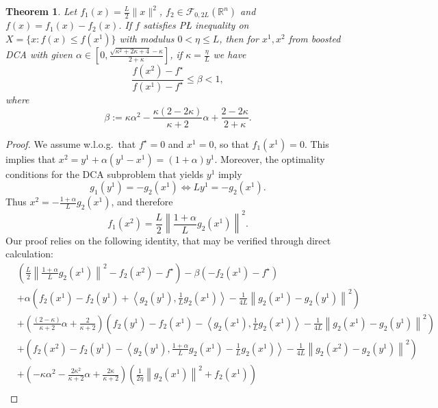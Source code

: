 \documentclass{article} %
\newtheorem{theorem}{Theorem}
\renewcommand{\leq}{\leqslant}
\begin{document}
\begin{theorem}
\label{thm:GD PL}
Let $f_1(x)=\frac{L}{2}\|x\|^2$, $f_2\in\mathcal{F}_{0, 2L}({\mathbb{R}^n})$ and $f(x)=f_1(x)-f_2(x)$. If
     $f$ satisfies P{\L} inequality on $X=\{x: f(x)\leq f(x^1)\}$ with modulus $0<\eta\leq L$, then for $x^1, x^2$  from boosted DCA with given
      $\alpha \in \left[0, \frac{\sqrt{\kappa^2 + 2\kappa +4}-\kappa}{2+ \kappa} \right]$,
      if $\kappa=\frac{\eta}{L}$ we have
\[
\frac{f(x^2)-f^\star}{f(x^1)-f^\star}\leq \beta < 1,
\]
where
\begin{equation}
\label{def:beta}
    \beta := \kappa \alpha^2 - \frac{\kappa(2-2\kappa)}{\kappa+2}\alpha + \frac{2-2\kappa}{2+\kappa}.
\end{equation}

\end{theorem}
\begin{proof}
  We assume w.l.o.g.\ that $f^\star=0$ and $x^1=0$, so that $f_1(x^1) = 0$. This implies that $x^2 = y^1 + \alpha(y^1-x^1) = (1+\alpha)y^1$.
  Moreover, the optimality conditions for the DCA subproblem that yields $y^1$ imply
  \[
  g_1(y^1) = -g_2(x^1) \Longleftrightarrow Ly^1 = - g_2(x^1).
  \]
Thus $x^2 = - \frac{1+\alpha}{L}g_2(x^1)$, and therefore
\begin{equation}
\label{eq:f1x2}
f_1(x^2) = \frac{L}{2}\left\|\frac{1+\alpha}{L}g_2(x^1)\right\|^2.
\end{equation}
   Our proof relies on the following identity, that may be verified through direct calculation:
\begin{align}
&{\left(\frac{L}{2}\left\|\frac{1+\alpha}{L}g_2(x^1)\right\|^2  -f_2(x^2)-f^\star\right)}-\beta\left( {-f_2(x^1)-f^\star} \right) \label{i} \\
&+\alpha \left( f_2(x^1)-f_2(y^{1})+\left\langle g_2(y^{1}), \frac{1}{L}g_2(x^{1})\right\rangle-\tfrac{1}{4L}\left\|g_2(x^1)-g_2(y^{1})\right\|^2\right) \label{ib}\\
&+ \left(\frac{(2-\kappa)}{\kappa+2}\alpha + \frac{2}{\kappa+2}\right) \left( f_2(y^1)-f_2(x^{1})-\left\langle g_2(x^{1}), \frac{1}{L}g_2(x^{1})\right\rangle-\tfrac{1}{4L}\left\|g_2(x^1)-g_2(y^{1})\right\|^2\right) \label{ii}\\
&+\left( f_2(x^2)-f_2(y^{1})-\left\langle g_2(y^{1}), \frac{1+\alpha}{L}g_2(x^1)-\frac{1}{L}g_2(x^{1})\right\rangle-\tfrac{1}{4L}\left\|g_2(x^2)-g_2(y^{1})\right\|^2\right) \label{iii}\\
&+\left(-\kappa\alpha^2 - \frac{2\kappa^2}{\kappa+2}\alpha + \frac{2\kappa}{\kappa+2}\right)\left(\frac{1}{2\eta}\left\|g_2(x^1)\right\|^2+f_2(x^1)\right) \label{iv}\\

\end{align}
\end{proof}
\end{document}
